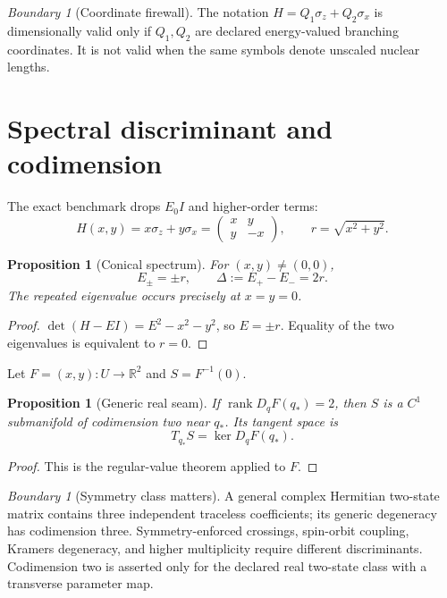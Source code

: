 \documentclass[11pt,a4paper]{article}
\theoremstyle{definition}
\theoremstyle{plain}
\newtheorem{proposition}[definition]{Proposition}
\theoremstyle{remark}
\newtheorem{warning}[definition]{Boundary}
\newcommand{\R}{\mathbb{R}}
\newcommand{\rank}{\operatorname{rank}}
\begin{document}
\begin{warning}[Coordinate firewall]
The notation \(H=Q_1\sigma_z+Q_2\sigma_x\) is dimensionally valid only
if \(Q_1,Q_2\) are declared energy-valued branching coordinates. It
is not valid when the same symbols denote unscaled nuclear lengths.
\end{warning}

\section{Spectral discriminant and codimension}

The exact benchmark drops \(E_0I\) and higher-order terms:
\begin{equation}\label{eq:benchmark-hamiltonian}
H(x,y)=x\sigma_z+y\sigma_x
=\begin{pmatrix}x&y\\y&-x\end{pmatrix},
\qquad
r=\sqrt{x^2+y^2}.
\end{equation}

\begin{proposition}[Conical spectrum]\label{prop:conical-spectrum}
For \((x,y)\ne(0,0)\),
\begin{equation}\label{eq:eigenvalues-gap}
E_\pm=\pm r,\qquad \Delta:=E_+-E_-=2r.
\end{equation}
The repeated eigenvalue occurs precisely at \(x=y=0\).
\end{proposition}

\begin{proof}
\(\det(H-EI)=E^2-x^2-y^2\), so \(E=\pm r\). Equality of the two
eigenvalues is equivalent to \(r=0\).
\end{proof}

Let \(F=(x,y):U\to\R^2\) and \(S=F^{-1}(0)\).

\begin{proposition}[Generic real seam]\label{prop:codimension}
If \(\rank D_qF(q_\ast)=2\), then \(S\) is a \(C^1\) submanifold of
codimension two near \(q_\ast\). Its tangent space is
\[
T_{q_\ast}S=\ker D_qF(q_\ast).
\]
\end{proposition}

\begin{proof}
This is the regular-value theorem applied to \(F\).
\end{proof}

\begin{warning}[Symmetry class matters]
A general complex Hermitian two-state matrix contains three
independent traceless coefficients; its generic degeneracy has
codimension three. Symmetry-enforced crossings, spin-orbit coupling,
Kramers degeneracy, and higher multiplicity require different
discriminants. Codimension two is asserted only for the declared real
two-state class with a transverse parameter map.
\end{warning}
\end{document}
